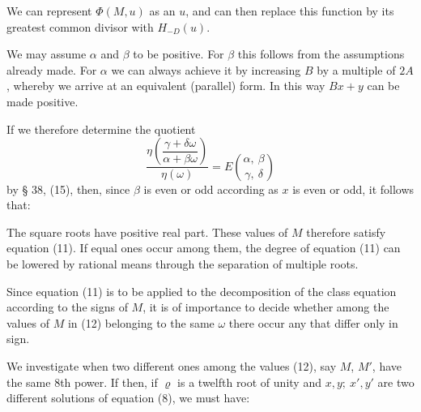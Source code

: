 
We can represent $\Phi(M,u)$ as an  $u$, and can then replace this function by its greatest common divisor with $H_{-D}(u)$.

We may assume $\alpha$ and $\beta$ to be positive. For $\beta$ this follows from the assumptions already made. For $\alpha$ we can always achieve it by increasing $B$ by a multiple of $2A$, whereby we arrive at an equivalent (parallel) form. In this way $Bx+y$ can be made positive.

If we therefore determine the quotient
\[
\frac{\eta\left(\dfrac{\gamma+\delta\omega}{\alpha+\beta\omega}\right)}{\eta(\omega)} = E\binom{\alpha,\ \beta}{\gamma,\ \delta}
\]
by § 38, (15), then, since $\beta$ is even or odd according as $x$ is even or odd, it follows that:


The square roots
have positive real part. These values of $M$ therefore satisfy equation (11). If equal ones occur among them, the degree of equation (11) can be lowered by rational means through the separation of multiple roots.

Since equation (11) is to be applied to the decomposition of the class equation according to the signs of $M$, it is of importance to decide whether among the values of $M$ in (12) belonging to the same $\omega$ there occur any that differ only in sign.

We investigate when two different ones among the values (12), say $M$, $M'$, have the same 8th power. If
then, if $\varrho$ is a twelfth root of unity and $x,y;\ x',y'$ are two different solutions of equation (8), we must have:
